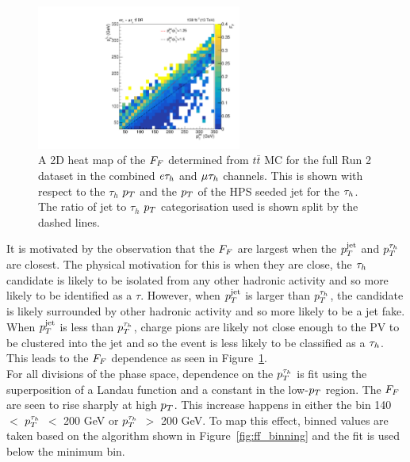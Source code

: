 \begin{figure}[!hbtp]
\centering
    \includegraphics[width=0.6\textwidth]{Figures/ff_colz_ttbar_lt_v2.pdf}
\caption{A 2D heat map of the $F_{F}$ determined from $t\bar{t}$ MC for the full Run 2 dataset in the combined $e\tau_{h}$ and $\mu\tau_{h}$ channels. This is shown with respect to the $\tau_h$ $p_{T}$ and the $p_{T}$ of the HPS seeded jet for the $\tau_{h}$. The ratio of jet to $\tau_h$ $p_{T}$ categorisation used is shown split by the dashed lines.}
\label{fig:ff_colz}
\end{figure}

It is motivated by the observation that the $F_{F}$ are largest when the $p_{T}^{\text{jet}}$ and $p_{T}^{\tau_{h}}$ are closest.
The physical motivation for this is when they are close, the $\tau_{h}$ candidate is likely to be isolated from any other hadronic activity and so more likely to be identified as a $\tau$.
However, when $p_{T}^{\text{jet}}$ is larger than $p_{T}^{\tau_{h}}$, the candidate is likely surrounded by other hadronic activity and so more likely to be a jet fake.
When $p_{T}^{\text{jet}}$ is less than $p_{T}^{\tau_{h}}$, charge pions are likely not close enough to the \ac{PV} to be clustered into the jet and so the event is less likely to be classified as a $\tau_{h}$. 
This leads to the $F_{F}$ dependence as seen in Figure~\ref{fig:ff_colz}.\\

For all divisions of the phase space, dependence on the $p_{T}^{\tau_{h}}$ is fit using the superposition of a Landau function and a constant in the low-$p_{T}$ region.
The $F_{F}$ are seen to rise sharply at high $p_{T}$.
This increase happens in either the bin 140 $<$ $p_{T}^{\tau_{h}}$ $<$ 200 GeV or $p_{T}^{\tau_{h}}$ $>$ 200 GeV.
To map this effect, binned values are taken based on the algorithm shown in Figure~\ref{fig:ff_binning} and the fit is used below the minimum bin.

